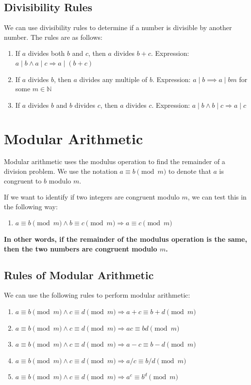 \documentclass[11pt]{article}
\begin{document}
\subsection{Divisibility Rules}
\label{sec:org27645b5}
We can use divisibility rules to determine if a number is divisible by another number. The rules are as follows:
\begin{enumerate}
\item If \(a\) divides both \(b\) and \(c\), then \(a\) divides \(b+c\). Expression: \(a \mid b \land a \mid c \Rightarrow a \mid (b+c)\)
\item If \(a\) divides \(b\), then \(a\) divides any multiple of \(b\). Expression: \(a \mid b \implies a \mid bm\) for some \(m \in \mathbb{N}\)
\item If \(a\) divides \(b\) and \(b\) divides \(c\), then \(a\) divides \(c\). Expression: \(a \mid b \land b \mid c \Rightarrow a \mid c\)
\end{enumerate}

\section{Modular Arithmetic}
\label{sec:org70ad30f}
Modular arithmetic uses the modulus operation to find the remainder of a division problem. We use the notation \(a \equiv b \pmod{m}\) to denote that \(a\) is congruent to \(b\) modulo \(m\).

If we want to identify if two integers are congruent modulo \(m\), we can test this in the following way:
\begin{enumerate}
\item \(a \equiv b \pmod{m} \land b \equiv c \pmod{m} \Rightarrow a \equiv c \pmod{m}\)
\end{enumerate}

\textbf{In other words, if the remainder of the modulus operation is the same, then the two numbers are congruent modulo \(m\).}

\subsection{Rules of Modular Arithmetic}
\label{sec:org4d63c27}
We can use the following rules to perform modular arithmetic:
\begin{enumerate}
\item \(a \equiv b \pmod{m} \land c \equiv d \pmod{m} \Rightarrow a+c \equiv b+d \pmod{m}\)
\item \(a \equiv b \pmod{m} \land c \equiv d \pmod{m} \Rightarrow ac \equiv bd \pmod{m}\)
\item \(a \equiv b \pmod{m} \land c \equiv d \pmod{m} \Rightarrow a-c \equiv b-d \pmod{m}\)
\item \(a \equiv b \pmod{m} \land c \equiv d \pmod{m} \Rightarrow a/c \equiv b/d \pmod{m}\)
\item \(a \equiv b \pmod{m} \land c \equiv d \pmod{m} \Rightarrow a^c \equiv b^d \pmod{m}\)
\end{enumerate}
\end{document}
